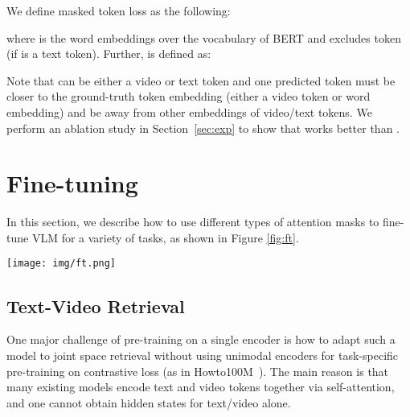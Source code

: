 \documentclass[11pt,a4paper]{article}
\begin{document}
We define masked token loss  as the following:

where  is the word embeddings over the vocabulary of BERT and  excludes token  (if  is a text token).
Further,  is defined as:

Note that  can be either a video or text token and one predicted token  must be closer to the ground-truth token embedding (either a video token or word embedding) and be away from other embeddings of video/text tokens.
We perform an ablation study in Section~\ref{sec:exp} to show that  works better than .  

\section{Fine-tuning}
\label{sec:ft}

In this section, we describe how to use different types of attention masks to fine-tune VLM for a variety of tasks, as shown in Figure \ref{fig:ft}.


\begin{figure*}[t]
\centering
\texttt{[image: img/ft.png]}
    \caption{Fine-tuning of downstream tasks: we adopt different types of attention masks for BERT to accommodate downstream tasks that require different modalities: in each box, the upper sub-figure indicates a forward computation; the lower sub-figure indicates squared self-attention mask, where tokens from each row have a weighted sum of columns that are not in white colors.}
\vspace{-3mm}
\label{fig:ft}
\end{figure*}

\subsection{Text-Video Retrieval}
One major challenge of pre-training on a single encoder is how to adapt such a model to joint space retrieval without using unimodal encoders for task-specific pre-training on contrastive loss
(as in Howto100M~\cite{miech2019howto100m,miech2020end}). 
The main reason is that many existing models encode text and video tokens together via self-attention, and one cannot obtain hidden states for text/video alone.
\end{document}
